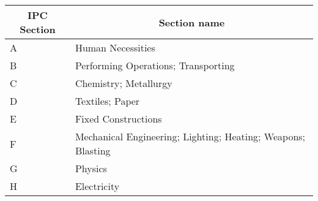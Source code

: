 \begin{tabular}{ll}
    \midrule
    \multicolumn{1}{c}{IPC Section} & \multicolumn{1}{c}{Section name} \\
    \midrule
    A & Human Necessities \\
    B & Performing Operations; Transporting \\
    C & Chemistry; Metallurgy \\
    D & Textiles; Paper \\
    E & Fixed Constructions \\
    F & Mechanical Engineering; Lighting; Heating; Weapons; Blasting \\
    G & Physics \\
    H & Electricity \\
    \bottomrule
\end{tabular}
